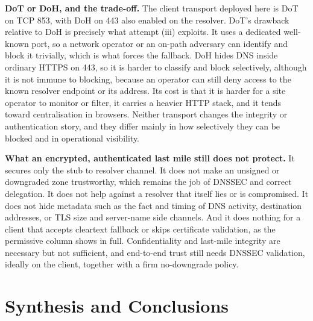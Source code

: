 \documentclass[11pt]{article}
\begin{document}
\textbf{DoT or DoH, and the trade-off.} The client transport deployed here is DoT
on TCP 853, with DoH on 443 also enabled on the resolver. DoT's drawback relative
to DoH is precisely what attempt (iii) exploits. It uses a dedicated well-known
port, so a network operator or an on-path adversary can identify and block it
trivially, which is what forces the fallback. DoH hides DNS inside ordinary HTTPS
on 443, so it is harder to classify and block selectively, although it is not immune
to blocking, because an operator can still deny access to the known resolver
endpoint or its address. Its cost is that it is harder for a site operator to
monitor or filter, it carries a heavier HTTP stack, and it tends toward
centralisation in browsers. Neither transport changes the integrity or
authentication story, and they differ mainly in how selectively they can be blocked
and in operational visibility.

\textbf{What an encrypted, authenticated last mile still does not protect.} It
secures only the stub to resolver channel. It does not make an unsigned or
downgraded zone trustworthy, which remains the job of DNSSEC and correct
delegation. It does not help against a resolver that itself lies or is compromised.
It does not hide metadata such as the fact and timing of DNS activity, destination
addresses, or TLS size and server-name side channels. And it does nothing for a
client that accepts cleartext fallback or skips certificate validation, as the
permissive column shows in full. Confidentiality and last-mile integrity are
necessary but not sufficient, and end-to-end trust still needs DNSSEC validation,
ideally on the client, together with a firm no-downgrade policy.


\clearpage

\section{Synthesis and Conclusions}
\end{document}
